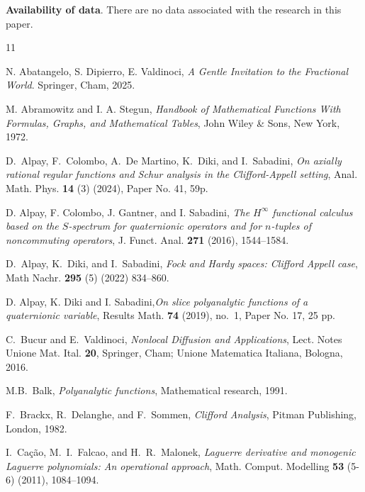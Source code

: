 \documentclass[reqno,11pt]{amsart}
\theoremstyle{definition}
\begin{document}
{\bf Availability of data}. There are no data associated with the research in this paper.



\begin{thebibliography}{11}

 N. Abatangelo, S. Dipierro, E. Valdinoci,
 \textit{A Gentle Invitation to the Fractional World}. Springer, Cham, 2025.



M. Abramowitz and I. A. Stegun,
\newblock \textit{Handbook of Mathematical Functions With Formulas, Graphs, and	Mathematical Tables},
\newblock John Wiley \& Sons, New York, 1972.



D.~Alpay, F.~Colombo, A.~De Martino, K.~Diki, and I.~Sabadini,
\textit{On axially rational regular functions and Schur analysis in the Clifford-Appell setting},
Anal. Math. Phys. \textbf{14} (3) (2024), Paper No. 41, 59p.



D. Alpay, F. Colombo, J. Gantner, and I. Sabadini,
\textit{The $H^\infty$ functional calculus based on the $S$-spectrum for quaternionic operators and for $n$-tuples of noncommuting operators},
J. Funct. Anal. {\bf 271} (2016), 1544--1584.





D.~Alpay, K.~Diki, and I.~Sabadini,
\textit{Fock and Hardy spaces: Clifford Appell case},
Math Nachr. \textbf{295} (5) (2022) 834--860.

D. Alpay, K. Diki and I. Sabadini,\emph{On slice polyanalytic functions of a quaternionic variable}, Results Math. {\bf 74} (2019), no.~1, Paper No. 17, 25 pp.


C.~Bucur and E.~Valdinoci,
\textit{Nonlocal Diffusion and Applications},
Lect. Notes Unione Mat. Ital. \textbf{20}, Springer, Cham; Unione Matematica Italiana, Bologna, 2016.

 M.B.~Balk, \emph{Polyanalytic functions}, Mathematical research, 1991.

F.~Brackx, R.~Delanghe, and F.~Sommen,
\textit{Clifford Analysis}, Pitman Publishing, London, 1982.



I.~Cação, M.~I.~Falcao, and H.~R.~Malonek,
\textit{Laguerre derivative and monogenic Laguerre polynomials: An operational approach},
Math. Comput. Modelling \textbf{53} (5-6) (2011), 1084--1094.


\end{thebibliography}
\end{document}
